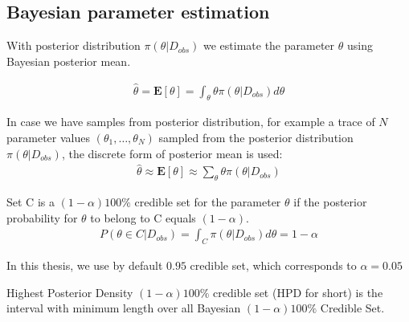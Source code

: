 \subsection{Bayesian parameter estimation}
With posterior distribution $\pi(\theta|D_{obs})$ we estimate the parameter $\hat{\theta}$ using Bayesian
posterior mean.
\begin{definition}
    \rm
    \begin{align*}
        \hat{\theta} = \mathbf{E}[\theta] = \int_\theta \theta \pi(\theta|D_{obs}) d\theta
    \end{align*}
\end{definition}
In case we have samples from posterior distribution, for example a trace of $N$ parameter values
$(\theta_1,\ldots,\theta_N)$ sampled from the posterior distribution $\pi(\theta|D_{obs})$, the
discrete form of posterior mean is used:
\begin{align*}
    \hat{\theta} \approx \mathbf{E}[\theta] \approx \sum_\theta \theta \pi(\theta|D_{obs})
\end{align*}

\begin{definition}
    Set C is a $(1 − \alpha )100\%$ credible set for the parameter $\theta$ if the posterior
    probability for $\theta$ to belong to C equals $(1 − \alpha)$.
    \begin{align*}
        P(\theta \in C | D_{obs}) = \int_C \pi(\theta|D_{obs}) d\theta = 1 - \alpha
    \end{align*}
\end{definition}
\noindent In this thesis, we use by default $0.95$ credible set, which corresponds to $\alpha=0.05$
\begin{definition}
    Highest Posterior Density $(1-\alpha)100\%$ credible set (HPD for short) is the
    interval with minimum length over all Bayesian $(1-\alpha)100\%$ Credible Set.
\end{definition}

